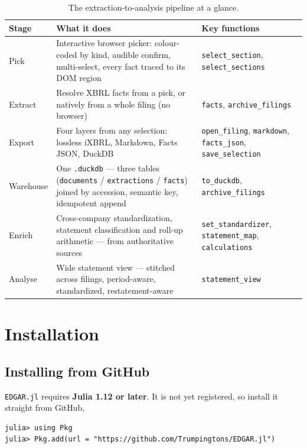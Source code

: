 \documentclass[11pt,a4paper]{report}
\begin{document}
\begin{table}[h]
\centering
\caption{The extraction-to-analysis pipeline at a glance.}
\label{tab:at-a-glance}
\small
\begin{tabular}{@{}p{}p{}p{}@{}}
\toprule
\textbf{Stage} & \textbf{What it does} & \textbf{Key functions} \\
\midrule
Pick & Interactive browser picker: colour-coded by kind, audible confirm, multi-select, every fact traced to its DOM region & \texttt{select\_section}, \texttt{select\_sections} \\
Extract & Resolve XBRL facts from a pick, or natively from a whole filing (no browser) & \texttt{facts}, \texttt{archive\_filings} \\
Export & Four layers from any selection: lossless iXBRL, Markdown, Facts JSON, DuckDB & \texttt{open\_filing}, \texttt{markdown}, \texttt{facts\_json}, \texttt{save\_selection} \\
Warehouse & One \texttt{.duckdb} --- three tables (\texttt{documents} / \texttt{extractions} / \texttt{facts}) joined by accession, semantic key, idempotent append & \texttt{to\_duckdb}, \texttt{archive\_filings} \\
Enrich & Cross-company standardization, statement classification and roll-up arithmetic --- from authoritative sources & \texttt{set\_standardizer}, \texttt{statement\_map}, \texttt{calculations} \\
Analyse & Wide statement view --- stitched across filings, period-aware, standardized, restatement-aware & \texttt{statement\_view} \\
\bottomrule
\end{tabular}
\end{table}

\chapter{Installation}
\label{sec:install}

\section{Installing from GitHub}
\texttt{EDGAR.jl} requires \textbf{Julia 1.12 or later}. It is not yet registered, so install it straight from GitHub,

\begin{lstlisting}
julia> using Pkg
julia> Pkg.add(url = "https://github.com/Trumpingtons/EDGAR.jl")
\end{lstlisting}
\end{document}
